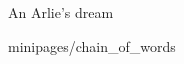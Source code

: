 \documentclass[xcolor=x11names,compress]{beamer}
\begin{document}
{
\begin{frame}[t]{An Arlie's dream}
    \vspace{-0.2cm}
    
    
     {minipages/chain_of_words}
\end{frame}}
\end{document}
